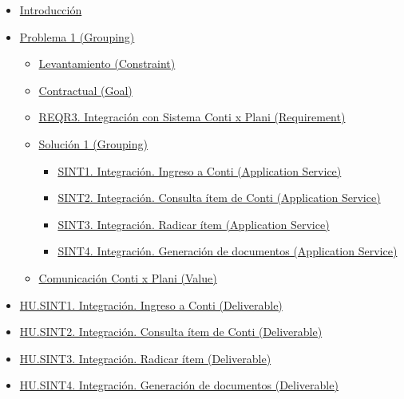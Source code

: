 \documentclass[
  paper=a4,
  ,captions=tableheading
]{scrartcl}
\providecommand{\tightlist}{%
  \setlength{\itemsep}{0pt}\setlength{\parskip}{0pt}}
\begin{document}
\begin{itemize}
\tightlist
\item
  \hyperref[Introducciuxf3n]{Introducción}
\item
  \hyperref[problema-1-grouping]{Problema 1 (Grouping)}

  \begin{itemize}
  \tightlist
  \item
    \hyperref[levantamiento-constraint]{Levantamiento (Constraint)}
  \item
    \hyperref[contractual-goal]{Contractual (Goal)}
  \item
    \hyperref[reqr3.-integraciuxf3n-con-sistema-conti-x-plani-requirement]{REQR3.
    Integración con Sistema Conti x Plani (Requirement)}
  \item
    \hyperref[soluciuxf3n-1-grouping]{Solución 1 (Grouping)}

    \begin{itemize}
    \tightlist
    \item
      \hyperref[sint1.-integraciuxf3n.-ingreso-a-conti-application-service]{SINT1.
      Integración. Ingreso a Conti (Application Service)}
    \item
      \hyperref[sint2.-integraciuxf3n.-consulta-uxedtem-de-conti-application-service]{SINT2.
      Integración. Consulta ítem de Conti (Application Service)}
    \item
      \hyperref[sint3.-integraciuxf3n.-radicar-uxedtem-application-service]{SINT3.
      Integración. Radicar ítem (Application Service)}
    \item
      \hyperref[sint4.-integraciuxf3n.-generaciuxf3n-de-documentos-application-service]{SINT4.
      Integración. Generación de documentos (Application Service)}
    \end{itemize}
  \item
    \hyperref[comunicaciuxf3n-conti-x-plani-value]{Comunicación Conti x
    Plani (Value)}
  \end{itemize}
\item
  \hyperref[hu.sint1.-integraciuxf3n.-ingreso-a-conti-deliverable]{HU.SINT1.
  Integración. Ingreso a Conti (Deliverable)}
\item
  \hyperref[hu.sint2.-integraciuxf3n.-consulta-uxedtem-de-conti-deliverable]{HU.SINT2.
  Integración. Consulta ítem de Conti (Deliverable)}
\item
  \hyperref[hu.sint3.-integraciuxf3n.-radicar-uxedtem-deliverable]{HU.SINT3.
  Integración. Radicar ítem (Deliverable)}
\item
  \hyperref[hu.sint4.-integraciuxf3n.-generaciuxf3n-de-documentos-deliverable]{HU.SINT4.
  Integración. Generación de documentos (Deliverable)}
\end{itemize}
\end{document}
